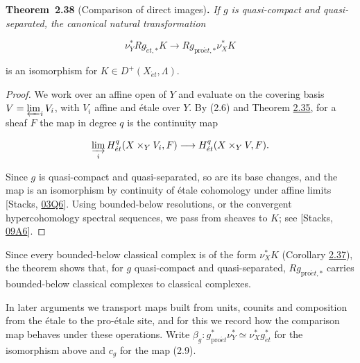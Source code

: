 \documentclass[11pt]{article}
\newenvironment{bpstatement}[2]{\par\addvspace{0.6\baselineskip}\noindent\textbf{#1}#2\textbf{.}\enspace\ignorespaces}
  {\par\addvspace{0.4\baselineskip}}
\newenvironment{bpstatementit}[2]{\begin{bpstatement}{#1}{#2}\itshape\ignorespaces}{\end{bpstatement}}
\begin{document}
\label{bp111}%
\begin{bpstatementit}{Theorem~2.38}{ (Comparison of direct images)}
If \(g\) is quasi-compact and quasi-separated, the canonical natural transformation

\[
\nu_Y^*Rg_{\acute{e}t,*}K\longrightarrow
Rg_{\mathrm{pro}\acute{e}t,*}\nu_X^*K
\tag{2.9}
\]

is an isomorphism for \(K\in D^+(X_{\acute{e}t},\Lambda)\).
\end{bpstatementit}

\begin{proof}[{Proof}]\label{bp112}%
We work over an affine open of \(Y\) and evaluate on the covering basis \(V=\varprojlim_iV_i\), with \(V_i\) affine and étale over \(Y\). By (2.6) and Theorem \hyperref[bp101]{2.35}, for a sheaf \(F\) the map in degree \(q\) is the continuity map

\[
\varinjlim_i H^q_{\acute{e}t}(X\times_YV_i,F)
\longrightarrow
H^q_{\acute{e}t}(X\times_YV,F).
\]

Since \(g\) is quasi-compact and quasi-separated, so are its base changes, and the map is an isomorphism by continuity of étale cohomology under affine limits [Stacks, \href{https://stacks.math.columbia.edu/tag/03Q6}{03Q6}]. Using bounded-below resolutions, or the convergent hypercohomology spectral sequences, we pass from sheaves to \(K\); see [Stacks, \href{https://stacks.math.columbia.edu/tag/09A6}{09A6}].
\end{proof}

\label{bp113}%
Since every bounded-below classical complex is of the form \(\nu_X^*K\) (Corollary \hyperref[bp107]{2.37}), the theorem shows that, for \(g\) quasi-compact and quasi-separated, \(Rg_{\mathrm{pro}\acute{e}t,*}\) carries bounded-below classical complexes to classical complexes.

In later arguments we transport maps built from units, counits and composition from the étale to the pro-étale site, and for this we record how the comparison map behaves under these operations. Write \(\beta_g:g_{\mathrm{pro}\acute{e}t}^*\nu_Y^*\simeq\nu_X^*g_{\acute{e}t}^*\) for the isomorphism above and \(c_g\) for the map (2.9).
\end{document}
